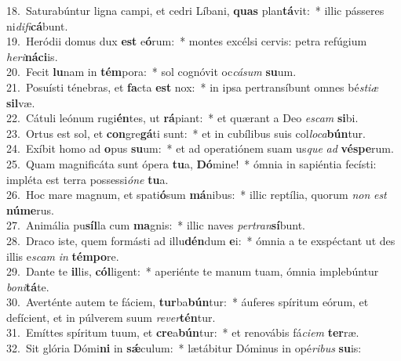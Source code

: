 {18.~}Saturabúntur ligna campi, et cedri Líbani, \textbf{quas} plan\textbf{tá}vit:~* illic pásseres ni\textit{di}\textit{fi}\textbf{cá}bunt.\\
{19.~}Heródii domus dux \textbf{est} e\textbf{ó}rum:~* montes excélsi cervis: petra refúgium \textit{he}\textit{ri}\textbf{ná}\textbf{ci}is.\\
{20.~}Fecit \textbf{lu}nam in \textbf{tém}pora:~* sol cognóvit oc\textit{cá}\textit{sum} \textbf{su}um.\\
{21.~}Posuísti ténebras, et \textbf{fa}cta \textbf{est} nox:~* in ipsa pertransíbunt omnes bé\textit{sti}\textit{æ} \textbf{sil}væ.\\
{22.~}Cátuli leónum rugi\textbf{én}tes, ut \textbf{rá}piant:~* et quærant a Deo \textit{e}\textit{scam} \textbf{si}bi.\\
{23.~}Ortus est sol, et \textbf{con}gre\textbf{gá}ti sunt:~* et in cubílibus suis col\textit{lo}\textit{ca}\textbf{bún}tur.\\
{24.~}Exíbit homo ad \textbf{o}pus \textbf{su}um:~* et ad operatiónem suam us\textit{que} \textit{ad} \textbf{vé}\textbf{spe}rum.\\
{25.~}Quam magnificáta sunt ópera \textbf{tu}a, \textbf{Dó}mine!~* ómnia in sapiéntia fecísti: impléta est terra possessi\textit{ó}\textit{ne} \textbf{tu}a.\\
{26.~}Hoc mare magnum, et spati\textbf{ó}sum \textbf{má}nibus:~* illic reptília, quorum \textit{non} \textit{est} \textbf{nú}\textbf{me}rus.\\
{27.~}Animália pu\textbf{síl}la cum \textbf{ma}gnis:~* illic naves \textit{per}\textit{tran}\textbf{sí}bunt.\\
{28.~}Draco iste, quem formásti ad illu\textbf{dén}dum \textbf{e}i:~* ómnia a te exspéctant ut des illis e\textit{scam} \textit{in} \textbf{tém}\textbf{po}re.\\
{29.~}Dante te \textbf{il}lis, \textbf{cól}ligent:~* aperiénte te manum tuam, ómnia implebúntur \textit{bo}\textit{ni}\textbf{tá}te.\\
{30.~}Averténte autem te fáciem, \textbf{tur}ba\textbf{bún}tur:~* áuferes spíritum eórum, et defícient, et in púlverem suum \textit{re}\textit{ver}\textbf{tén}tur.\\
{31.~}Emíttes spíritum tuum, et \textbf{cre}a\textbf{bún}tur:~* et renovábis fá\textit{ci}\textit{em} \textbf{ter}ræ.\\
{32.~}Sit glória Dómi\textbf{ni} in \textbf{sǽ}culum:~* lætábitur Dóminus in opé\textit{ri}\textit{bus} \textbf{su}is:\\
